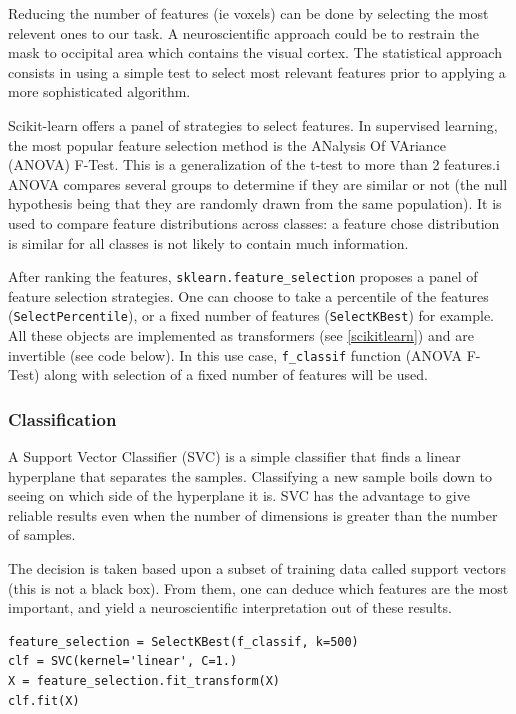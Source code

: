 \documentclass{frontiersSCNS} %
\begin{document}
Reducing the number of features (ie voxels) can be done by selecting the most
relevent ones to our task. A neuroscientific approach could be to restrain the
mask to occipital area which contains the visual cortex. The statistical
approach consists in using a simple test to select most relevant features prior
to applying a more sophisticated algorithm.

Scikit-learn offers a panel of strategies to select features. In supervised
learning, the most popular feature selection method is the
ANalysis Of VAriance (ANOVA) F-Test. This is a generalization of the t-test to
more than 2 features.i
ANOVA compares several groups to determine if they are similar or not (the null
hypothesis being that they are randomly drawn from the same population).
It is used to compare feature distributions across classes: a feature chose
distribution is similar for all classes is not likely to contain much
information.

After ranking the features, \verb!sklearn.feature_selection! proposes a panel
of feature selection strategies. One can choose to take a percentile of the features
(\verb!SelectPercentile!), or a fixed number of features (\verb!SelectKBest!)
for example. All these objects are implemented as transformers (see
\ref{scikitlearn}) and are invertible (see code below).
In this use case, \verb!f_classif! function (ANOVA F-Test) along with selection
of a fixed number of features will be used.

\subsubsection{Classification}

A Support Vector Classifier (SVC) is a simple classifier that finds a linear
hyperplane that separates the samples. Classifying a new sample boils down to
seeing on which side of the hyperplane it is. SVC has the advantage to
give reliable results even when the number of dimensions is greater than the
number of samples.

The decision is taken based upon a subset of training data called
support vectors (this is not a black box). From them, one can deduce which
features are the most important, and yield a neuroscientific interpretation out
of these results.

\begin{lstlisting}
feature_selection = SelectKBest(f_classif, k=500)
clf = SVC(kernel='linear', C=1.)
X = feature_selection.fit_transform(X)
clf.fit(X)
\end{lstlisting}
\end{document}
